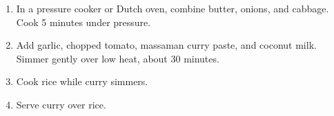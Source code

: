 
\begin{ingredients}
\end{ingredients}


\begin{recipe}
  \begin{enumerate}

  \item In a pressure cooker or Dutch oven, combine butter, onions,
    and cabbage.  Cook 5 minutes under pressure.

  \item Add garlic, chopped tomato, massaman curry paste, and coconut
    milk.  Simmer gently over low heat, about 30 minutes.

  \item Cook rice while curry simmers.

  \item Serve curry over rice.

  \end{enumerate}
\end{recipe}
